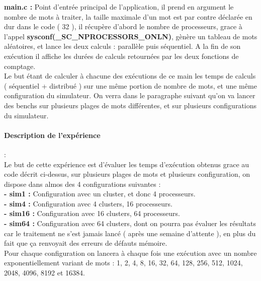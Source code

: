 \textbf{main.c :} Point d'entrée principal de l'application, il prend en argument le nombre de mots à traiter, la taille maximale d'un mot est par contre déclarée en dur dans le code ( 32 ), il récupère d'abord le nombre de processeurs, grace à l'appel \textbf{sysconf(\_SC\_NPROCESSORS\_ONLN)}, gènère un tableau de mots aléatoires, et lance les deux calculs : parallèle puis séquentiel. A la fin de son exécution il affiche les durées de calculs retournées par les deux fonctions de comptage.\\
Le but étant de calculer à chacune des exécutions de ce main les temps de calculs ( séquentiel + distribué ) sur une même portion de nombre de mots, et une même configuration du simulateur. On verra dans le paragraphe suivant qu'on va lancer des benchs sur plusieurs plages de mots différentes, et sur plusieurs configurations du simulateur.

\paragraph{Description de l'expérience}:\\

Le but de cette expérience est d'évaluer les temps d'exécution obtenus grace au code décrit ci-dessus, sur plusieurs plages de mots et plusieurs configuration, on dispose dans almos des 4 configurations suivantes :\\
\textbf{- sim1  :} Configuration avec un cluster, et donc 4 processeurs.\\
\textbf{- sim4  :} Configuration avec 4 clusters, 16 processeurs.\\
\textbf{- sim16 :} Configuration avec 16 clusters, 64 processeurs.\\
\textbf{- sim64 :} Configuration avec 64 clusters, dont on pourra pas évaluer les résultats car le traitement ne s'est jamais lancé ( après une semaine d'attente ), en plus du fait que ça renvoyait des erreurs de défauts mémoire.\\
Pour chaque configuration on lancera à chaque fois une exécution avec un nombre exponentiellement variant de mots : 1, 2, 4, 8, 16, 32, 64, 128, 256, 512, 1024, 2048, 4096, 8192 et 16384.\\
